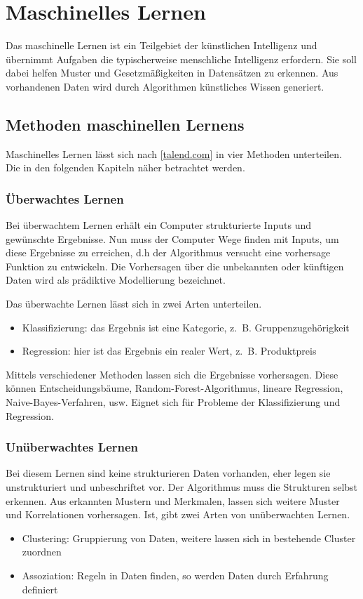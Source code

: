 \chapter{Maschinelles Lernen}
Das maschinelle Lernen ist ein Teilgebiet der künstlichen Intelligenz und übernimmt Aufgaben die typischerweise menschliche Intelligenz erfordern. Sie soll dabei helfen Muster und Gesetzmäßigkeiten in Datensätzen zu erkennen. Aus vorhandenen Daten wird durch Algorithmen künstliches Wissen generiert.

\section{Methoden maschinellen Lernens}
Maschinelles Lernen lässt sich nach [\href{https://www.talend.com/de/resources/maschinelles-lernen}{talend.com}] in vier Methoden unterteilen. Die in den folgenden Kapiteln näher betrachtet werden.

\subsection{Überwachtes Lernen}
Bei überwachtem Lernen erhält ein Computer strukturierte Inputs und gewünschte Ergebnisse. Nun muss der Computer Wege finden mit Inputs, um diese Ergebnisse zu erreichen, d.h der Algorithmus versucht eine vorhersage Funktion zu entwickeln. Die Vorhersagen über die unbekannten oder künftigen Daten wird als prädiktive Modellierung bezeichnet.\vspace{0.2cm}

Das überwachte Lernen lässt sich in zwei Arten unterteilen.
\begin{itemize}
	\item Klassifizierung: das Ergebnis ist eine Kategorie, z. B. Gruppenzugehörigkeit
	\item Regression: hier ist das Ergebnis ein realer Wert, z. B. Produktpreis
\end{itemize}

Mittels verschiedener Methoden lassen sich die Ergebnisse vorhersagen. Diese können Entscheidungsbäume, Random-Forest-Algorithmus, lineare Regression, Naive-Bayes-Verfahren, usw. Eignet sich für Probleme der Klassifizierung und Regression.

\subsection{Unüberwachtes Lernen}
Bei diesem Lernen sind keine strukturieren Daten vorhanden, eher legen sie unstrukturiert und unbeschriftet vor. Der Algorithmus muss die Strukturen selbst erkennen. Aus erkannten Mustern und Merkmalen, lassen sich weitere Muster und Korrelationen vorhersagen. Ist, gibt zwei Arten von unüberwachten Lernen.
\begin{itemize}
	\item Clustering: Gruppierung von Daten, weitere lassen sich in bestehende Cluster zuordnen
	\item Assoziation: Regeln in Daten finden, so werden Daten durch Erfahrung definiert
\end{itemize}

